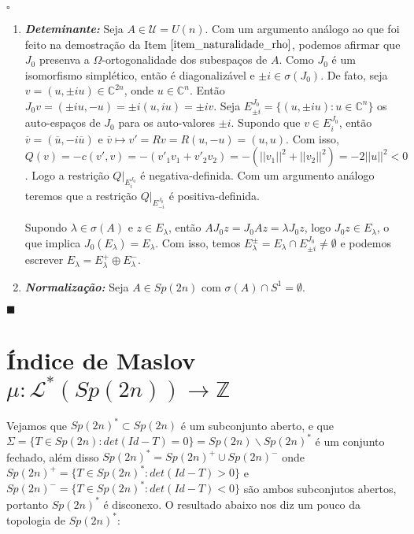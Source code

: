 \documentclass[12pt]{book}
\newenvironment{prova}[1]{$\square$ #1}{\hfill$\blacksquare$}
\newcommand{\caminhosNaoDegeneradosSp}{\mathcal{L}^{*}(\gruposimpletico{2n})}
\newcommand{\circulo}{S^{1}}
\newcommand{\complexo}[1]{\mathbb{C}^{#1}}
\newcommand{\estruturacomplexa}{J_{0}}
\newcommand{\gruposimpletico}[1]{Sp(#1)}
\newcommand{\inteiros}{\mathbb{Z}}
\newcommand{\matrizunitaria}[1]{U(#1)}
\newcommand{\norma}[1]{||#1||}
\begin{document}
\begin{prova}
\begin{enumerate}
			
			\item \textbf{\textit{Deteminante:}} Seja $A \in \mathcal{U} = \matrizunitaria{n}$. Com um argumento análogo ao que foi feito na demostração da Item $\ref{item_naturalidade_rho}$, podemos afirmar que $\estruturacomplexa$ presenva a $\Omega$-ortogonalidade dos subespaços de $A$. Como $\estruturacomplexa$ é um isomorfismo simplético, então é diagonalizável  e $\pm i \in \sigma(\estruturacomplexa)$. De fato, seja $v = (u, \pm iu) \in \complexo{2n}$, onde $u \in \complexo{n}$. Então $\estruturacomplexa v = (\pm iu, -u) = \pm i(u,iu) = \pm iv$. Seja $E^{\estruturacomplexa}_{\pm i} = \{(u, \pm i u):u \in \complexo{n} \}$ os auto-espaços de $\estruturacomplexa$ para os auto-valores $\pm i$.
			Supondo que $v \in E^{\estruturacomplexa}_{ i}$, então $\overline{v} = (\overline{u}, -i \overline{u})$ e $\overline{v} \mapsto v' = Rv = R(u, -u) = (u,u)$. Com isso, $Q(v) = -c(v', v) = -(v'_{1}v_{1}+v'_{2}v_{2}) = -(\norma{v_{1}}^{2}+\norma{v_{2}}^{2}) =-2\norma{u}^{2}<0$. Logo a restrição $Q|_{E^{\estruturacomplexa}_{ i}}$ é negativa-definida. Com um argumento análogo teremos que a restrição $Q|_{E^{\estruturacomplexa}_{-i}}$ é positiva-definida.

			Supondo $\lambda \in \sigma(A)$ e $z \in E_{\lambda}$, então $ A\estruturacomplexa z = \estruturacomplexa A z= \lambda \estruturacomplexa z$, logo $\estruturacomplexa z \in E_{\lambda}$, o que implica $\estruturacomplexa(E_{\lambda}) = E_{\lambda}$. Com isso, temos $E_{\lambda}^{\pm} =E_{\lambda}\cap E^{\estruturacomplexa}_{\pm i}  \neq \emptyset$ e podemos escrever $E_{\lambda} = E_{\lambda}^{+}\oplus E_{\lambda}^{-}$.
			
			\item \textbf{\textit{Normalização:}} Seja $A\in \gruposimpletico{2n}$ com $\sigma(A)\cap \circulo = \emptyset$. 
		\end{enumerate}
	\end{prova}
		
	\section{Índice de Maslov $\mu : \caminhosNaoDegeneradosSp \to \inteiros$}
	
	
	Vejamos que $Sp(2n)^{*} \subset Sp(2n)$ é um subconjunto aberto, e que $\Sigma = \{T\in Sp(2n): det(Id-T)=0\} = Sp(2n)\backslash Sp(2n)^{*}$ é um conjunto fechado, além disso $Sp(2n)^{*} = Sp(2n)^{+}\cup Sp(2n)^{-}$ onde $Sp(2n)^{+}=\{T\in Sp(2n)^{*}: det(Id-T)>0\} $ e $Sp(2n)^{-}=\{T\in Sp(2n)^{*}: det(Id-T)<0\}$ são ambos subconjutos abertos, portanto $Sp(2n)^{*}$ é disconexo. O resultado abaixo nos diz um pouco da topologia de $Sp(2n)^{*}$:
	
\end{document}

